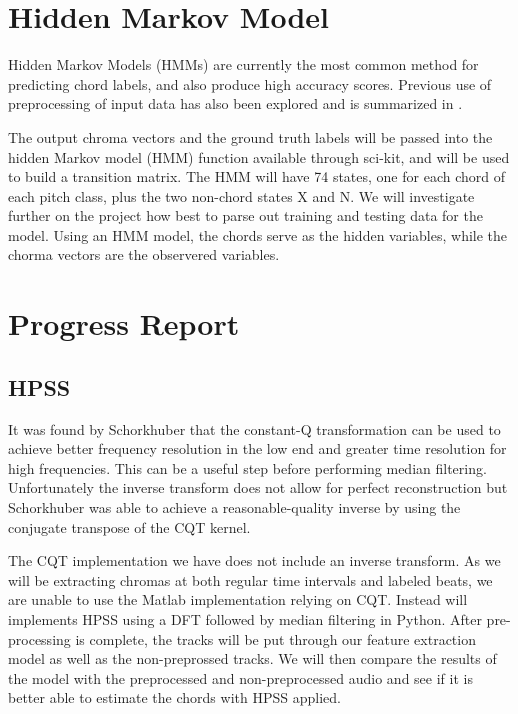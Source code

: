 \documentclass{article}
\begin{document}
\section{Hidden Markov Model}

Hidden Markov Models (HMMs) are currently the most common method for predicting
chord labels, and also produce high accuracy scores. Previous use of
preprocessing of input data has also been explored and is summarized in
\cite{McVicar:00}.

The output chroma vectors and the ground truth labels will be passed into the
hidden Markov model (HMM) function available through sci-kit, and will be used
to build a transition matrix. The HMM will have 74 states, one for each chord
of each pitch class, plus the two non-chord states X and N. We will investigate
further on the project how best to parse out training and testing data for the
model. Using an HMM model, the chords serve as the hidden variables, while the chorma vectors are the observered variables.

\section{Progress Report}\label{sec:progreport}

\subsection{HPSS}
It was found by Schorkhuber \cite{Schorkhuber:21} that the constant-Q
transformation can be used to achieve better frequency resolution in the low
end and greater time resolution for high frequencies. This can be a useful step
before performing median filtering. Unfortunately the inverse transform does
not allow for perfect reconstruction but Schorkhuber was able to achieve a
reasonable-quality inverse by using the conjugate transpose of the CQT kernel.

The CQT implementation we have does not include an inverse transform. As we
will be extracting chromas at both regular time intervals and labeled beats, we
are unable to use the Matlab implementation relying on CQT.  Instead will
implements HPSS using a DFT followed by median filtering in Python. After
pre-processing is complete, the tracks will be put through our feature
extraction model as well as the non-preprossed tracks. We will then compare the
results of the model with the preprocessed and non-preprocessed audio and see if
it is better able to estimate the chords with HPSS applied.
\end{document}
